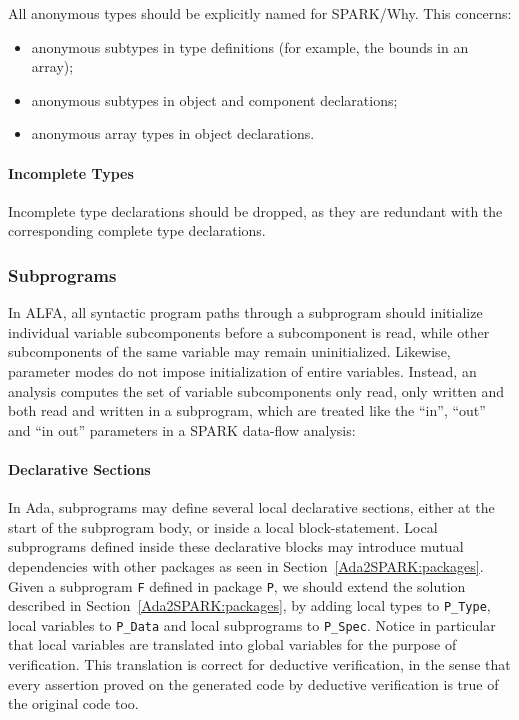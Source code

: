 \documentclass{article}
\newcounter{example}
\begin{document}
All anonymous types should be explicitly named for SPARK/Why. This concerns:
\begin{itemize}
\item anonymous subtypes in type definitions (for example, the bounds in an
  array);
\item anonymous subtypes in object and component declarations;
\item anonymous array types in object declarations.
\end{itemize}

\paragraph{Incomplete Types}

Incomplete type declarations should be dropped, as they are redundant with the
corresponding complete type declarations.

\subsubsection{Subprograms}
\label{Ada2SPARK:subprograms}

 In ALFA, all syntactic
program paths through a subprogram should initialize individual variable
subcomponents before a subcomponent is read, while other subcomponents of the
same variable may remain uninitialized. Likewise, parameter modes do not impose
initialization of entire variables. Instead, an analysis computes the set of
variable subcomponents only read, only written and both read and written in a
subprogram, which are treated like the ``in'', ``out'' and ``in out''
parameters in a SPARK data-flow analysis:

\paragraph{Declarative Sections}

In Ada, subprograms may define several local declarative sections, either at
the start of the subprogram body, or inside a local block-statement. Local
subprograms defined inside these declarative blocks may introduce mutual
dependencies with other packages as seen in
Section~\ref{Ada2SPARK:packages}. Given a subprogram \verb|F| defined in
package \verb|P|, we should extend the solution described in
Section~\ref{Ada2SPARK:packages}, by adding local types to \verb|P_Type|, local
variables to \verb|P_Data| and local subprograms to \verb|P_Spec|. Notice in
particular that local variables are translated into global variables for the
purpose of verification. This translation is correct for deductive
verification, in the sense that every assertion proved on the generated code by
deductive verification is true of the original code too.
\end{document}
